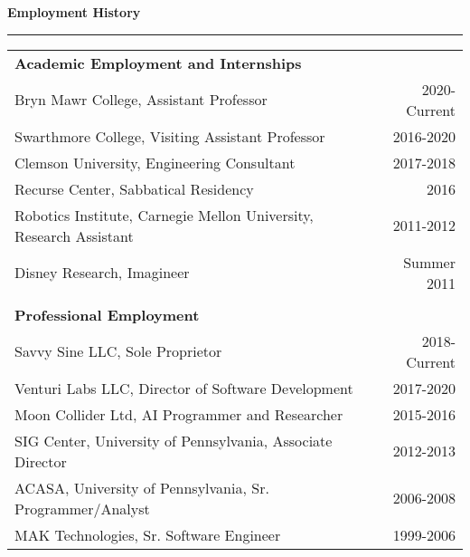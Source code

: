 \needspace{6em}
{\Large {\bf Employment History}} 
\vspace{0.1cm}
\hrule
\medskip

\begin{tabular*}{7.1in}{@{}l@{\extracolsep\fill}r}
{\bf Academic Employment and Internships} \\
Bryn Mawr College, Assistant Professor & 2020-Current\\
Swarthmore College, Visiting Assistant Professor & 2016-2020\\
Clemson University, Engineering Consultant & 2017-2018\\
Recurse Center, Sabbatical Residency & 2016\\
Robotics Institute, Carnegie Mellon University, Research Assistant & 2011-2012\\
Disney Research, Imagineer & Summer 2011\\
\phantom{yommomma} & \phantom{2002}\\
{\bf Professional Employment} \\
Savvy Sine LLC, Sole Proprietor & 2018-Current\\ 
Venturi Labs LLC, Director of Software Development & 2017-2020\\
Moon Collider Ltd, AI Programmer and Researcher & 2015-2016\\
SIG Center, University of Pennsylvania, Associate Director & 2012-2013\\
ACASA, University of Pennsylvania, Sr. Programmer/Analyst & 2006-2008\\
MAK Technologies, Sr. Software Engineer & 1999-2006\\
\end{tabular*}




